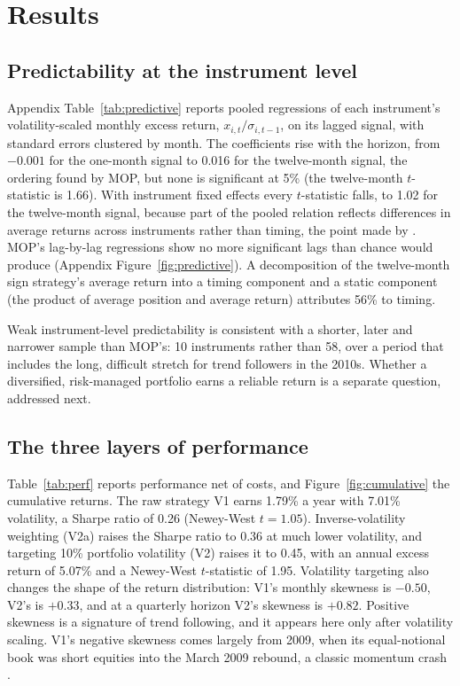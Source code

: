 \documentclass[11pt,a4paper]{article}
\begin{document}
\FloatBarrier
\section{Results}
\label{sec:results}

\subsection{Predictability at the instrument level}

Appendix Table~\ref{tab:predictive} reports pooled regressions of each instrument's volatility-scaled monthly excess return, $x_{i,t}/\sigma_{i,t-1}$, on its lagged signal, with standard errors clustered by month. The coefficients rise with the horizon, from $-0.001$ for the one-month signal to 0.016 for the twelve-month signal, the ordering found by MOP, but none is significant at 5\% (the twelve-month $t$-statistic is 1.66). With instrument fixed effects every $t$-statistic falls, to 1.02 for the twelve-month signal, because part of the pooled relation reflects differences in average returns across instruments rather than timing, the point made by \citet{huang2020}. MOP's lag-by-lag regressions show no more significant lags than chance would produce (Appendix Figure~\ref{fig:predictive}). A decomposition of the twelve-month sign strategy's average return into a timing component and a static component (the product of average position and average return) attributes 56\% to timing.

Weak instrument-level predictability is consistent with a shorter, later and narrower sample than MOP's: 10 instruments rather than 58, over a period that includes the long, difficult stretch for trend followers in the 2010s. Whether a diversified, risk-managed portfolio earns a reliable return is a separate question, addressed next.

\subsection{The three layers of performance}

Table~\ref{tab:perf} reports performance net of costs, and Figure~\ref{fig:cumulative} the cumulative returns. The raw strategy V1 earns 1.79\% a year with 7.01\% volatility, a Sharpe ratio of 0.26 (Newey-West $t = 1.05$). Inverse-volatility weighting (V2a) raises the Sharpe ratio to 0.36 at much lower volatility, and targeting 10\% portfolio volatility (V2) raises it to 0.45, with an annual excess return of 5.07\% and a Newey-West $t$-statistic of 1.95. Volatility targeting also changes the shape of the return distribution: V1's monthly skewness is $-0.50$, V2's is $+0.33$, and at a quarterly horizon V2's skewness is $+0.82$. Positive skewness is a signature of trend following, and it appears here only after volatility scaling. V1's negative skewness comes largely from 2009, when its equal-notional book was short equities into the March 2009 rebound, a classic momentum crash \citep{daniel2016}.
\end{document}
